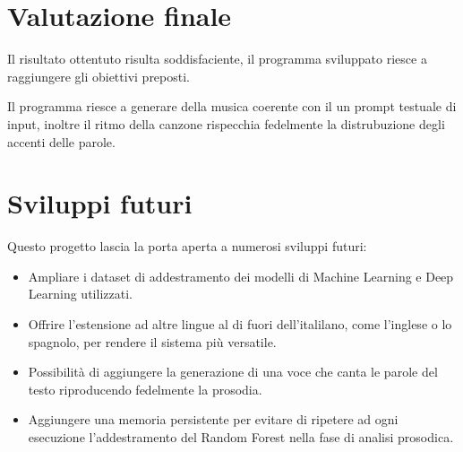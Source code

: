 \section{Valutazione finale}
Il risultato ottentuto risulta soddisfaciente, il programma sviluppato riesce a raggiungere gli obiettivi preposti.

Il programma riesce a generare della musica coerente con il un prompt testuale di input, inoltre il ritmo della canzone rispecchia fedelmente la distrubuzione degli accenti delle parole.



\section{Sviluppi futuri}
Questo progetto lascia la porta aperta a numerosi sviluppi futuri:
\begin{itemize}
    \item Ampliare i dataset di addestramento dei modelli di Machine Learning e Deep Learning utilizzati.
    \item Offrire l'estensione ad altre lingue al di fuori dell'italilano, come l'inglese o lo spagnolo, per rendere il sistema più versatile.
    \item Possibilità di aggiungere la generazione di una voce che canta le parole del testo riproducendo fedelmente la prosodia.
    \item Aggiungere una memoria persistente per evitare di ripetere ad ogni esecuzione l'addestramento del Random Forest nella fase di analisi prosodica. 
\end{itemize}


